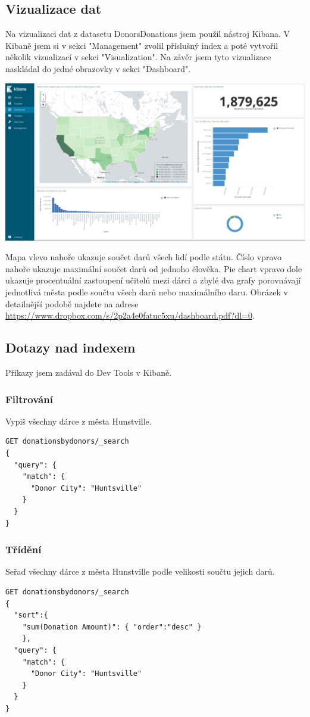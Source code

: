 \documentclass[12pt,a4paper]{article}
\begin{document}
\subsection{Vizualizace dat}
Na vizualizaci dat z datasetu DonorsDonations jsem použil nástroj Kibana. V Kibaně jsem si v sekci "Management" zvolil příslušný index a poté vytvořil několik vizualizací v sekci "Visualization". Na závěr jsem tyto vizualizace naskládal do jedné obrazovky v sekci "Dashboard".
\begin{center}
\includegraphics[width=16cm]{dashboard}
\end{center}

Mapa vlevo nahoře ukazuje součet darů všech lidí podle státu. Číslo vpravo nahoře ukazuje maximální součet darů od jednoho člověka. Pie chart vpravo dole ukazuje procentuální zastoupení učitelů mezi dárci a zbylé dva grafy porovnávají jednotlivá města podle součtu všech darů nebo maximálního daru. Obrázek v detailnější podobě najdete na adrese \url{https://www.dropbox.com/s/2p2a4e0fatuc5xu/dashboard.pdf?dl=0}.

\pagebreak
\subsection{Dotazy nad indexem}
Příkazy jsem zadával do Dev Tools v Kibaně.
\subsubsection{Filtrování}
Vypiš všechny dárce z města Hunstville.
\begin{lstlisting}
GET donationsbydonors/_search
{
  "query": {
    "match": {
      "Donor City": "Huntsville"
    }
  }
}
\end{lstlisting}

\subsubsection{Třídění}
Seřaď všechny dárce z města Hunstville podle velikosti součtu jejich darů.
\begin{lstlisting}
GET donationsbydonors/_search
{
  "sort":{
    "sum(Donation Amount)": { "order":"desc" }
    },
  "query": {
    "match": {
      "Donor City": "Huntsville"
    }
  }
}
\end{lstlisting}
\pagebreak
\end{document}
